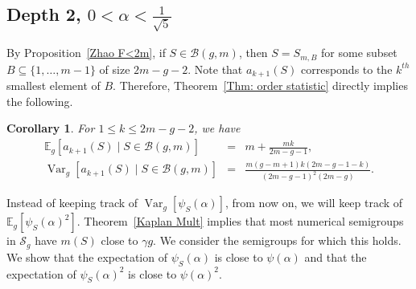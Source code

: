 \documentclass[12pt]{amsart}
\def\B{{\mathcal B}}
\def\E{{\mathbb E}}
\def\SS{{\mathcal S}}
\def\Var{{\operatorname{Var}}}
\newtheorem{corollary}[theorem]{Corollary}
\begin{document}
\subsection{Depth 2, $0<\alpha<\frac{1}{\sqrt{5}}$}\label{Subsec: depth 2}


By Proposition~\ref{Zhao F<2m}, if $S\in \B(g,m)$, then $S=S_{m,B}$ for some subset $B\subseteq\{1,\dots,m-1\}$ of size $2m-g-2$.
Note that $a_{k+1}(S)$ corresponds to the $k^{th}$ smallest element of $B$. Therefore, Theorem~\ref{Thm: order statistic} directly implies the following.

\begin{corollary}\label{Cor: ak+1 depth 2}
For $1\leq k\leq 2m-g-2$, we have
\begin{eqnarray*}
\E_g[a_{k+1}(S)\mid S\in \B(g,m)] & = & m+\frac{mk}{2m-g-1},\\
\Var_g[a_{k+1}(S)\mid S\in \B(g,m)] & = & \frac{m(g-m+1) k (2m-g-1-k)}{(2m-g-1)^2 (2m-g)}.
\end{eqnarray*}
\end{corollary}


Instead of keeping track of $\Var_g[\psi_S(\alpha)]$, from now on, we will keep track of $\E_g[\psi_S(\alpha)^2]$. Theorem~\ref{Kaplan Mult} implies that most numerical semigroups in $\SS_g$ have $m(S)$ close to $\gamma g$.  We consider the semigroups for which this holds.  We show that the expectation of $\psi_S(\alpha)$ is close to $\psi(\alpha)$ and that the expectation of $\psi_S(\alpha)^2$ is close to $\psi(\alpha)^2$.
\end{document}
